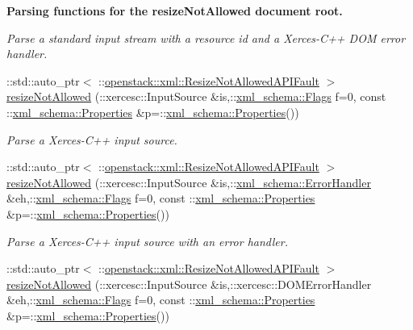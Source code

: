 \begin{Indent}{\bf Parsing functions for the resizeNotAllowed document root.}
\begin{DoxyCompactItemize}
\begin{DoxyCompactList}\small\item\em Parse a standard input stream with a resource id and a Xerces-\/C++ DOM error handler. \item\end{DoxyCompactList}\item 
::std::auto\_\-ptr$<$ ::\hyperlink{classopenstack_1_1xml_1_1ResizeNotAllowedAPIFault}{openstack::xml::ResizeNotAllowedAPIFault} $>$ \hyperlink{namespaceopenstack_1_1xml_a523fbae699267da4d7ece569411b212d}{resizeNotAllowed} (::xercesc::InputSource \&is,::\hyperlink{namespacexml__schema_affb4c227cbd9aa7453dd1dc5a1401943}{xml\_\-schema::Flags} f=0, const ::\hyperlink{namespacexml__schema_ad27ce19a7ee1d3b1064092648898f64c}{xml\_\-schema::Properties} \&p=::\hyperlink{namespacexml__schema_ad27ce19a7ee1d3b1064092648898f64c}{xml\_\-schema::Properties}())
\begin{DoxyCompactList}\small\item\em Parse a Xerces-\/C++ input source. \item\end{DoxyCompactList}\item 
::std::auto\_\-ptr$<$ ::\hyperlink{classopenstack_1_1xml_1_1ResizeNotAllowedAPIFault}{openstack::xml::ResizeNotAllowedAPIFault} $>$ \hyperlink{namespaceopenstack_1_1xml_a56ebd8d442100307bdc6378de0902a3f}{resizeNotAllowed} (::xercesc::InputSource \&is,::\hyperlink{namespacexml__schema_ab1c9361bfd3b404eaabf0c31eded79dc}{xml\_\-schema::ErrorHandler} \&eh,::\hyperlink{namespacexml__schema_affb4c227cbd9aa7453dd1dc5a1401943}{xml\_\-schema::Flags} f=0, const ::\hyperlink{namespacexml__schema_ad27ce19a7ee1d3b1064092648898f64c}{xml\_\-schema::Properties} \&p=::\hyperlink{namespacexml__schema_ad27ce19a7ee1d3b1064092648898f64c}{xml\_\-schema::Properties}())
\begin{DoxyCompactList}\small\item\em Parse a Xerces-\/C++ input source with an error handler. \item\end{DoxyCompactList}\item 
::std::auto\_\-ptr$<$ ::\hyperlink{classopenstack_1_1xml_1_1ResizeNotAllowedAPIFault}{openstack::xml::ResizeNotAllowedAPIFault} $>$ \hyperlink{namespaceopenstack_1_1xml_adc4bbbe1445977661460ace16811aad9}{resizeNotAllowed} (::xercesc::InputSource \&is,::xercesc::DOMErrorHandler \&eh,::\hyperlink{namespacexml__schema_affb4c227cbd9aa7453dd1dc5a1401943}{xml\_\-schema::Flags} f=0, const ::\hyperlink{namespacexml__schema_ad27ce19a7ee1d3b1064092648898f64c}{xml\_\-schema::Properties} \&p=::\hyperlink{namespacexml__schema_ad27ce19a7ee1d3b1064092648898f64c}{xml\_\-schema::Properties}())

\end{DoxyCompactItemize}
\end{Indent}
